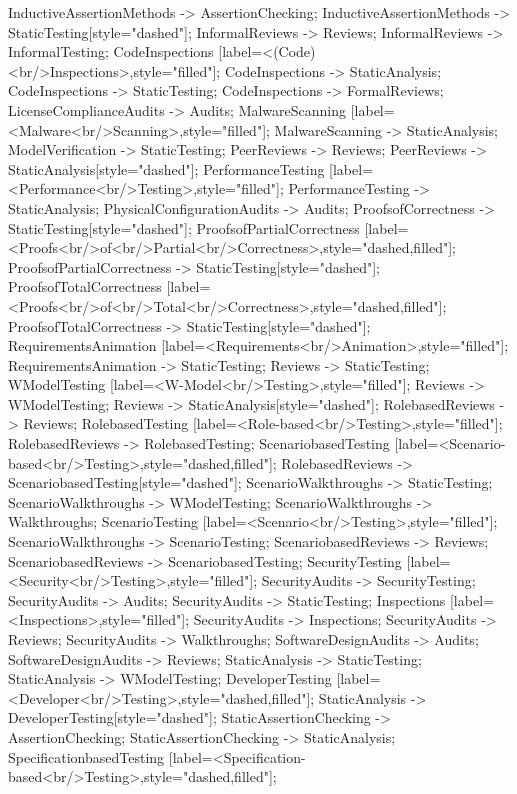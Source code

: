 \documentclass{article}
\begin{document}
{InductiveAssertionMethods -> AssertionChecking;
InductiveAssertionMethods -> StaticTesting[style="dashed"];
InformalReviews -> Reviews;
InformalReviews -> InformalTesting;
CodeInspections [label=<(Code)<br/>Inspections>,style="filled"];
CodeInspections -> StaticAnalysis;
CodeInspections -> StaticTesting;
CodeInspections -> FormalReviews;
LicenseComplianceAudits -> Audits;
MalwareScanning [label=<Malware<br/>Scanning>,style="filled"];
MalwareScanning -> StaticAnalysis;
ModelVerification -> StaticTesting;
PeerReviews -> Reviews;
PeerReviews -> StaticAnalysis[style="dashed"];
PerformanceTesting [label=<Performance<br/>Testing>,style="filled"];
PerformanceTesting -> StaticAnalysis;
PhysicalConfigurationAudits -> Audits;
ProofsofCorrectness -> StaticTesting[style="dashed"];
ProofsofPartialCorrectness [label=<Proofs<br/>of<br/>Partial<br/>Correctness>,style="dashed,filled"];
ProofsofPartialCorrectness -> StaticTesting[style="dashed"];
ProofsofTotalCorrectness [label=<Proofs<br/>of<br/>Total<br/>Correctness>,style="dashed,filled"];
ProofsofTotalCorrectness -> StaticTesting[style="dashed"];
RequirementsAnimation [label=<Requirements<br/>Animation>,style="filled"];
RequirementsAnimation -> StaticTesting;
Reviews -> StaticTesting;
WModelTesting [label=<W-Model<br/>Testing>,style="filled"];
Reviews -> WModelTesting;
Reviews -> StaticAnalysis[style="dashed"];
RolebasedReviews -> Reviews;
RolebasedTesting [label=<Role-based<br/>Testing>,style="filled"];
RolebasedReviews -> RolebasedTesting;
ScenariobasedTesting [label=<Scenario-based<br/>Testing>,style="dashed,filled"];
RolebasedReviews -> ScenariobasedTesting[style="dashed"];
ScenarioWalkthroughs -> StaticTesting;
ScenarioWalkthroughs -> WModelTesting;
ScenarioWalkthroughs -> Walkthroughs;
ScenarioTesting [label=<Scenario<br/>Testing>,style="filled"];
ScenarioWalkthroughs -> ScenarioTesting;
ScenariobasedReviews -> Reviews;
ScenariobasedReviews -> ScenariobasedTesting;
SecurityTesting [label=<Security<br/>Testing>,style="filled"];
SecurityAudits -> SecurityTesting;
SecurityAudits -> Audits;
SecurityAudits -> StaticTesting;
Inspections [label=<Inspections>,style="filled"];
SecurityAudits -> Inspections;
SecurityAudits -> Reviews;
SecurityAudits -> Walkthroughs;
SoftwareDesignAudits -> Audits;
SoftwareDesignAudits -> Reviews;
StaticAnalysis -> StaticTesting;
StaticAnalysis -> WModelTesting;
DeveloperTesting [label=<Developer<br/>Testing>,style="dashed,filled"];
StaticAnalysis -> DeveloperTesting[style="dashed"];
StaticAssertionChecking -> AssertionChecking;
StaticAssertionChecking -> StaticAnalysis;
SpecificationbasedTesting [label=<Specification-based<br/>Testing>,style="dashed,filled"];
}
\end{document}
